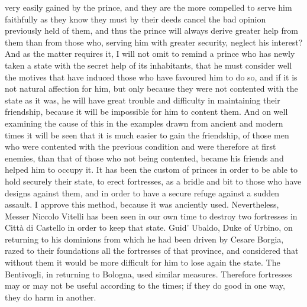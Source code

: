 \documentclass[12pt,letterpaper]{memoir}
\begin{document}
very easily gained by the prince, and they are the more compelled to
serve him faithfully as they know they must by their deeds cancel the
bad opinion previously held of them, and thus the prince will always
derive greater help from them than from those who, serving him with
greater security, neglect his interest? And as the matter requires it,
I will not omit to remind a prince who has newly taken a state with the
secret help of its inhabitants, that he must consider well the motives
that have induced those who have favoured him to do so, and if it is
not natural affection for him, but only because they were not contented
with the state as it was, he will have great trouble and difficulty in
maintaining their friendship, because it will be impossible for him to
content them. And on well examining the cause of this in the examples
drawn from ancient and modern times it will be seen that it is much
easier to gain the friendship, of those men who were contented with
the previous condition and were therefore at first enemies, than that
of those who not being contented, became his friends and helped him to
occupy it. It has been the custom of princes in order to be able to
hold securely their state, to erect fortresses, as a bridle and bit
to those who have designs against them, and in order to have a secure
refuge against a sudden assault. I approve this method, because it was
anciently used. Nevertheless, Messer Niccolo Vitelli has been seen in
our own time to destroy two fortresses in Città di Castello in order
to keep that state. Guid' Ubaldo, Duke of Urbino, on returning to his
dominions from which he had been driven by Cesare Borgia, razed to
their foundations all the fortresses of that province, and considered
that without them it would be more difficult for him to lose again the
state. The Bentivogli, in returning to Bologna, used similar measures.
Therefore fortresses may or may not be useful according to the times;
if they do good in one way, they do harm in another.
\end{document}

